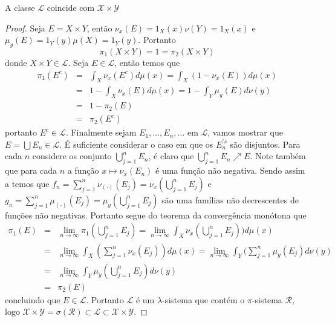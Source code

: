 \begin{proposicao}
A classe $\mathscr{L}$ coincide com $\mathscr{X}\times \mathscr{Y}$
\end{proposicao}


\begin{proof}
Seja $E=X\times Y$, então $\nu_x(E)=1_X(x)\nu(Y)=1_X(x)$ e $\mu_y(E)=1_Y(y)\mu(X)=1_Y(y)$. Portanto 
$$
\pi_1(X\times Y)=1=\pi_2(X\times Y)
$$
donde $X\times Y\in \mathscr{L}$. Seja $E\in \mathscr{L}$, então temos que
$$
\begin{array}{rcl}
\pi_1(E^c)&=&\displaystyle\int_X \nu_x(E^c)d\mu(x)
=
\int_X (1-\nu_x(E))d\mu(x)
\\[5mm]
&
=
&
\displaystyle 1-\int_X\nu_x(E) d\mu (x)
=
1-\int_Y \mu_y(E)d\nu(y)
\\[5mm]
&
=
&
1-\pi_2(E)
\\[5mm]
&
=
&
\pi_2(E^c)
\end{array}
$$
portanto $E^c\in \mathscr{L}$.  
Finalmente sejam $E_1, \ldots, E_n, \ldots $ em $\mathscr{L}$, vamos
mostrar que $E=\bigcup E_n\in \mathscr{L}.$ É suficiente considerar
o caso em que os $E_n^{'s}$ são disjuntos. Para cada $n$ considere os
conjunto $\bigcup_{j=1}^nE_n$, é claro que   $\bigcup_{j=1}^nE_n\nearrow E.$ Note
também que para cada $n$ a função $x\mapsto \nu_x(E_n)$ é uma função não negativa.
Sendo assim a temos que  $f_n=\sum_{j=1}^n\nu_{(\cdot)}(E_j)=\nu_x(\bigcup_{j=1}^{n}E_j)$
e $g_n=\sum_{j=1}^n\mu_{(\cdot)}(E_j)=\mu_y(\bigcup_{j=1}^{n}E_j)$ são
uma famílias não decrescentes de funções não negativas.
Portanto segue do teorema da convergência monótona
que
$$
\begin{array}{rcl}
\pi_1(E)&=&\displaystyle\lim_{n\to \infty}\pi_1(\bigcup_{j=1}^{n}E_j)
=
\lim_{n\to \infty}\int_X \nu_x(\bigcup_{j=1}^{n}E_j))d\mu(x)
\\[5mm]
&
=
&
\displaystyle \lim_{n\to \infty}\int_X (\sum_{j=1}^n\nu_x(E_j)) d\mu(x)
=
\lim_{n\to \infty}\int_Y(\sum_{j=1}^{n}\mu_y(E_j)d\nu(y)
\\[5mm]
&
=
&
\displaystyle\lim_{n\to \infty} \int_Y \mu_y(\bigcup_{j=1}^{n}E_j)d\nu(y)
\\
&=&
\pi_2(E)
\end{array}
$$
concluindo que $E\in \mathscr{L}$. Portanto $\mathscr{L}$ é um $\lambda$-sistema 
que contém o $\pi$-sistema $\mathscr{R}$, logo $\mathscr{X}\times \mathscr{Y}=\sigma(\mathscr{R})\subset \mathscr{L}\subset \mathscr{X}\times \mathscr{Y}.$

\end{proof}

